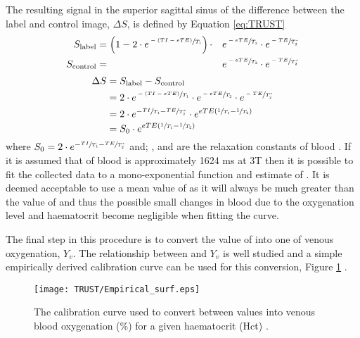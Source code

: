 The resulting signal in the superior sagittal sinus of the difference between the label and control image, $\Delta S$, is defined by Equation \eqref{eq:TRUST}
\begin{alignat}{2}
	S_{\text{label}} &=\left(1-2\cdot e^{\sfrac{-\left(TI - eTE\right)}{T_1}}\right) \cdot & &e^{\sfrac{-eTE}{T_2}} \cdot e^{\sfrac{-TE}{T_2^*}} \\
	S_{\text{control}} &= & &e^{\sfrac{-eTE}{T_2}} \cdot e^{\sfrac{-TE}{T_2^*}} 
\end{alignat}  
\begin{alignat}{1}
	\Delta S&=S_{\text{label}}-S_{\text{control}}\nonumber\\
	&= 2\cdot e^{\sfrac{-\left(TI - eTE\right)}{T_1}} \cdot e^{\sfrac{-eTE}{T_2}} \cdot e^{\sfrac{-TE}{T_2^*}} \nonumber\\
	&= 2 \cdot e^{-\sfrac{TI}{T_1}-\sfrac{TE}{T_2^*}} \cdot e^{eTE\left(\sfrac{1}{T_1}-\sfrac{1}{T_2}\right)}\nonumber\\
	&=S_0 \cdot e^{eTE\left(\sfrac{1}{T_1}-\sfrac{1}{T_2}\right)}
	\label{eq:TRUST}
\end{alignat}  
where $S_0=2 \cdot e^{-\sfrac{TI}{T_1}-\sfrac{TE}{T_2^*}}$ and; \tone, \ttwo and \ttwostar are the relaxation constants of blood \cite{lu_quantitative_2008}. If it is assumed that \tone of blood is approximately 1624 ms at 3T \cite{lu_determining_2004} then it is possible to fit the collected data to a mono-exponential function and estimate of \ttwo. It is deemed acceptable to use a mean value of \tone as it will always be much greater than the value of \ttwo and thus the possible small changes in blood \tone due to the oxygenation level and haematocrit become negligible when fitting the \ttwo curve.

The final step in this procedure is to convert the value of \ttwo into one of venous oxygenation, $Y_v$. The relationship between \ttwo and $Y_v$ is well studied and a simple empirically derived calibration curve can be used for this conversion, Figure \ref{fig:calibration_curve} \cite{gardener_dependence_2010, silvennoinen_comparison_2003, liu_t1_2016}.

\begin{figure}[H]
	\centering
	\texttt{[image: TRUST/Empirical\_surf.eps]}
	\caption{The calibration curve used to convert between \ttwo values into venous blood oxygenation (\%) for a given haematocrit (Hct) \cite{lu_calibration_2012}.}
	\label{fig:calibration_curve}	
\end{figure}

